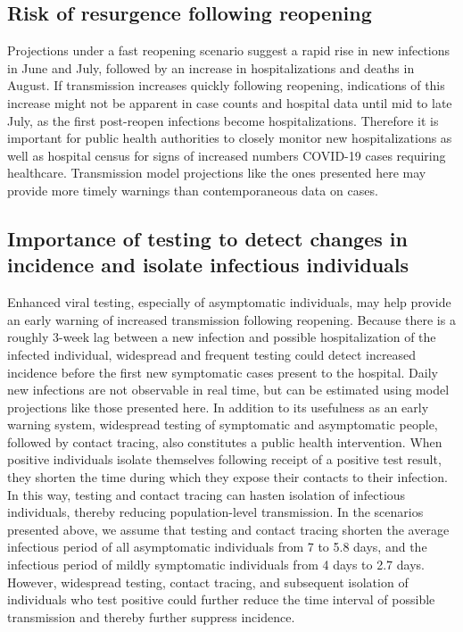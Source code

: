\documentclass[11pt]{article}
\begin{document}
\subsection*{Risk of resurgence following reopening} 

Projections under a fast reopening scenario suggest a rapid rise in new infections in June and July, followed by an increase in hospitalizations and deaths in August.  If transmission increases quickly following reopening, indications of this increase might not be apparent in case counts and hospital data until mid to late July, as the first post-reopen infections become hospitalizations.  Therefore it is important for public health authorities to closely monitor new hospitalizations as well as hospital census for signs of increased numbers COVID-19 cases requiring healthcare. Transmission model projections like the ones presented here may provide more timely warnings than contemporaneous data on cases.  


\subsection*{Importance of testing to detect changes in incidence and isolate infectious individuals}



Enhanced viral testing, especially of asymptomatic individuals, may help provide an early warning of increased transmission following reopening.  Because there is a roughly 3-week lag between a new infection and possible hospitalization of the infected individual, widespread and frequent testing could detect increased incidence before the first new symptomatic cases present to the hospital.  Daily new infections are not observable in real time, but can be estimated using model projections like those presented here.  In addition to its usefulness as an early warning system, widespread testing of symptomatic and asymptomatic people, followed by contact tracing, also constitutes a public health intervention. When positive individuals isolate themselves following receipt of a positive test result, they shorten the time during which they expose their contacts to their infection. In this way, testing and contact tracing can hasten isolation of infectious individuals, thereby reducing population-level transmission.  In the scenarios presented above, we assume that testing and contact tracing shorten the average infectious period of all asymptomatic individuals from 7 to 5.8 days, and the infectious period of mildly symptomatic individuals from 4 days to 2.7 days. However, widespread testing, contact tracing, and subsequent isolation of individuals who test positive could further reduce the time interval of possible transmission and thereby further suppress incidence.
\end{document}
